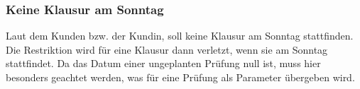 \subsubsection{Keine Klausur am Sonntag}
Laut dem Kunden bzw. der Kundin, soll keine Klausur am Sonntag stattfinden.
Die Restriktion wird für eine Klausur dann verletzt, wenn sie am Sonntag stattfindet.
Da das Datum einer ungeplanten Prüfung null ist, muss hier besonders geachtet werden, was für
eine Prüfung als Parameter übergeben wird.